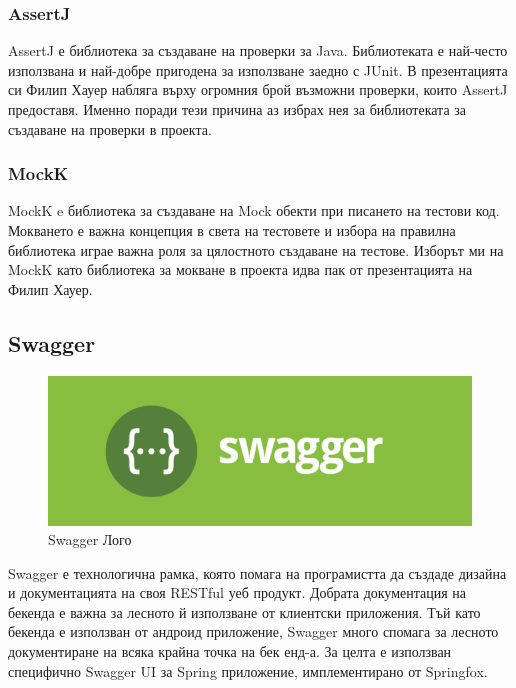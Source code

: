         \subsubsection{AssertJ}
        AssertJ е библиотека за създаване на проверки за Java. Библиотеката е най-често използвана и най-добре пригодена за използване заедно с JUnit. В презентацията си Филип Хауер набляга върху огромния брой възможни проверки, които AssertJ предоставя. Именно поради тези причина аз избрах нея за библиотеката за създаване на проверки в проекта.
        
        \subsubsection{MockK}
        MockK e библиотека за създаване на Mock обекти при писането на тестови код. Мокването е важна концепция в света на тестовете и избора на правилна библиотека играе важна роля за цялостното създаване на тестове. Изборът ми на MockK като библиотека за мокване в проекта идва пак от презентацията на Филип Хауер.
    
    \subsection{Swagger}
    
    \begin{figure}[h]
        \centering
        \includegraphics[scale=.5]{images/Swagger.png}
        \caption{Swagger Лого}
        \label{fig:swagger_logo}
    \end{figure}
    
    Swagger е технологична рамка, която помага на програмистта да създаде дизайна и документацията на своя RESTful уеб продукт. Добрата документация на бекенда е важна за лесното й използване от клиентски приложения. Тъй като бекенда е използван от андроид приложение, Swagger много спомага за лесното документиране на всяка крайна точка на бек енд-а. За целта е използван специфично Swagger UI за Spring приложение, имплементирано от Springfox. 
    
